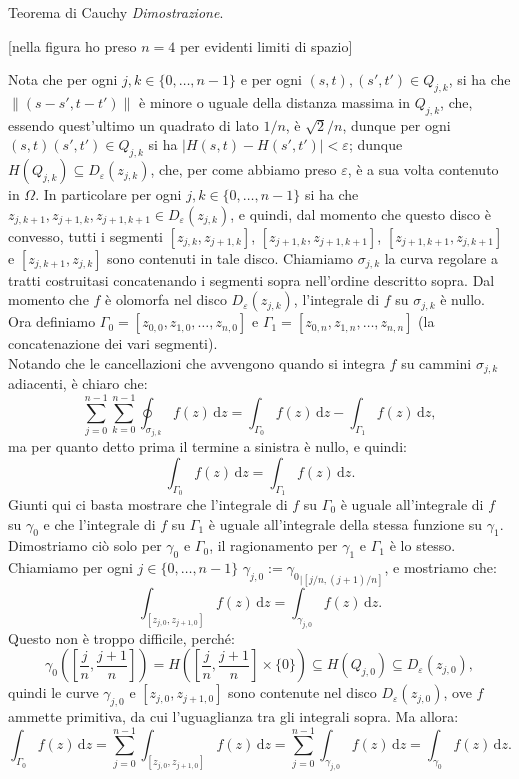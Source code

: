 \documentclass[11pt]{book}
\makeatletter
\theoremstyle{Definizione}
\theoremstyle{TeoremaProposizioneLemmaCorollarioCongettura}
\theoremstyle{OsservazioneNotaEsempio}
\renewenvironment{proof}[1][\proofname]{\par
  \normalfont \topsep6\p@\@plus6\p@\relax
  \trivlist
  \item[\hskip\labelsep
        \itshape
    #1\@addpunct{.}]\ignorespaces
}{%
  \endtrivlist\@endpefalse
}
\renewenvironment{proof}{\textsl{Dimostrazione}.}{}
\newcommand{\Disc}[3][]{D^{#1}_{{#2}}({#3})}
\newcommand{\sub}[2]{{#1}_{|{#2}}}
\renewcommand{\d}{\mathrm{d}}
\newcommand{\dz}{\,\d z}
\makeatother
\begin{document}
\begin{boxteo}{Teorema di Cauchy}
\begin{proof}
\begin{center}
\footnotesize{[nella figura ho preso $n = 4$ per evidenti limiti di spazio]}
\end{center}
Nota che per ogni $j,k\in \{0,\dots,n-1\}$ e per ogni $(s,t),(s',t')\in Q_{j,k}$, si ha che $\|(s-s',t-t')\|$ è minore o uguale della distanza massima in $Q_{j,k}$, che, essendo quest'ultimo un quadrato di lato $1/n$, è $\sqrt{2}/n$, dunque per ogni $(s,t)(s',t')\in Q_{j,k}$ si ha $|H(s,t)-H(s',t')| < \varepsilon$; dunque $H(Q_{j,k}) \subseteq \Disc{\varepsilon}{z_{j,k}}$, che, per come abbiamo preso $\varepsilon$, è a sua volta contenuto in $\Omega$. In particolare per ogni $j,k\in \{0,\dots,n-1\}$ si ha che $z_{j,k+1},z_{j+1,k},z_{j+1,k+1}\in \Disc{\varepsilon}{z_{j,k}}$, e quindi, dal momento che questo disco è convesso, tutti i segmenti $[z_{j,k},z_{j+1,k}]$, $[z_{j+1,k},z_{j+1,k+1}]$, $[z_{j+1,k+1},z_{j,k+1}]$ e $[z_{j,k+1},z_{j,k}]$ sono contenuti in tale disco. Chiamiamo $\sigma_{j,k}$ la curva regolare a tratti costruitasi concatenando i segmenti sopra nell'ordine descritto sopra. Dal momento che $f$ è olomorfa nel disco $\Disc{\varepsilon}{z_{j,k}}$, l'integrale di $f$ su $\sigma_{j,k}$ è nullo.\\
Ora definiamo $\Gamma_0 = [z_{0,0},z_{1,0},\dots,z_{n,0}]$ e $\Gamma_1 = [z_{0,n},z_{1,n},\dots,z_{n,n}]$ (la concatenazione dei vari segmenti).\\
Notando che le cancellazioni che avvengono quando si integra $f$ su cammini $\sigma_{j,k}$ adiacenti, è chiaro che:
$$
\sum_{j = 0}^{n-1}\sum_{k = 0}^{n-1} \oint_{\sigma_{j,k}} f(z)\dz = \int_{\Gamma_0} f(z)\dz - \int_{\Gamma_1} f(z)\dz,
$$
ma per quanto detto prima il termine a sinistra è nullo, e quindi:
$$
\int_{\Gamma_0} f(z)\dz = \int_{\Gamma_1} f(z)\dz.
$$
Giunti qui ci basta mostrare che l'integrale di $f$ su $\Gamma_0$ è uguale all'integrale di $f$ su $\gamma_0$ e che l'integrale di $f$ su $\Gamma_1$ è uguale all'integrale della stessa funzione su $\gamma_1$. Dimostriamo ciò solo per $\gamma_0$ e $\Gamma_0$, il ragionamento per $\gamma_1$ e $\Gamma_1$ è lo stesso.\\
Chiamiamo per ogni $j \in \{0,\dots,n-1\}$ $\gamma_{j,0} := \sub{\gamma_0}{[j/n,(j+1)/n]}$, e mostriamo che:
$$
\int_{[z_{j,0},z_{j+1,0}]} f(z)\dz = \int_{\gamma_{j,0}} f(z)\dz.
$$
Questo non è troppo difficile, perché:
$$
\gamma_0\left(\left[\frac{j}{n},\frac{j+1}{n}\right]\right) = H\left(\left[\frac{j}{n},\frac{j+1}{n}\right]\times \{0\}\right) \subseteq H(Q_{j,0})\subseteq \Disc{\varepsilon}{z_{j,0}},
$$
quindi le curve $\gamma_{j,0}$ e $[z_{j,0},z_{j+1,0}]$ sono contenute nel disco $\Disc{\varepsilon}{z_{j,0}}$, ove $f$ ammette primitiva, da cui l'uguaglianza tra gli integrali sopra. Ma allora:
$$
\int_{\Gamma_0} f(z)\dz = \sum_{j = 0}^{n-1} \int_{[z_{j,0},z_{j+1,0}]} f(z)\dz = \sum_{j = 0}^{n-1} \int_{\gamma_{j,0}} f(z)\dz = \int_{\gamma_0} f(z)\dz.
$$
\end{proof}
\end{boxteo}
\end{document}
